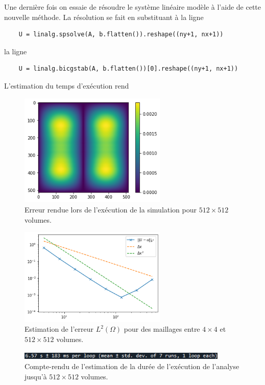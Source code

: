 Une dernière fois on essaie de résoudre le système linéaire modèle à l'aide de cette nouvelle méthode. La résolution se fait en substituant à la ligne
\begin{verbatim}
    U = linalg.spsolve(A, b.flatten()).reshape((ny+1, nx+1))
\end{verbatim}
la ligne
\begin{verbatim}
    U = linalg.bicgstab(A, b.flatten())[0].reshape((ny+1, nx+1))
\end{verbatim}
L'estimation du temps d'exécution rend
\begin{figure}[htp]
    \centering
    \includegraphics[width=7cm]{Images/preliminaires/Laplace Dirichlet 2D creux BICGSTAB/erreur.png}
    \caption{Erreur rendue lors de l'exécution de la simulation pour $512 \times 512$ volumes.}
    \label{fig:creuxLaplacien2DBICGSTABErreur}
\end{figure}

\begin{figure}[htp]
    \centering
    \includegraphics[width=7cm]{Images/preliminaires/Laplace Dirichlet 2D creux BICGSTAB/analyse.png}
    \caption{Estimation de l'erreur $L^2(\Omega)$ pour des maillages entre $4\times 4$ et $512 \times 512$ volumes.}
    \label{fig:creuxLaplacien2DBICGSTABAnalyse}
\end{figure}

\begin{figure}[htp]
\centering
    \includegraphics[width=10cm]{Images/preliminaires/Laplace Dirichlet 2D creux BICGSTAB/temps.png}
    \caption{Compte-rendu de l'estimation de la durée de l'exécution de l'analyse jusqu'à $512 \times 512$ volumes.}
    \label{fig:creuxLaplacienDirichlet2DBICGSTABTemps}
\end{figure}

